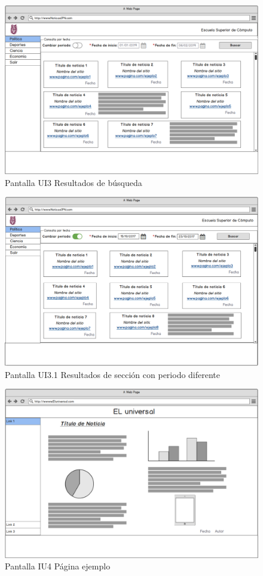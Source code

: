 \begin{figure}[h]
  \centering
	\includegraphics[scale=.35]{imagenes/Pantallas/UI3}
  \caption{Pantalla UI3 Resultados de búsqueda}
  \label{fig:UI3}
\end{figure}


\begin{figure}[h]
  \centering
  \includegraphics[scale=.35]{imagenes/Pantallas/UI3_1}
  \caption{Pantalla UI3.1 Resultados de sección con periodo diferente}
  \label{fig:UI3_1}
\end{figure}


\begin{figure}[h]
  \centering
	\includegraphics[scale=.35]{imagenes/Pantallas/UI4}
  \caption{Pantalla IU4 Página ejemplo}
  \label{fig:UI4}
\end{figure}
